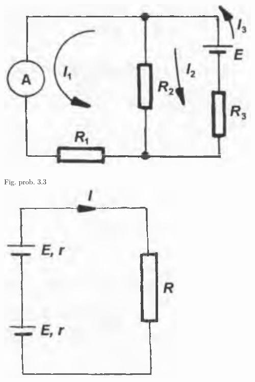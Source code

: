 \documentclass[10pt]{article}
\begin{document}
\begin{center}
\includegraphics[max width=\textwidth]{2025_07_01_5b3ff9fa0d508c8e9f17g-341(1)}
\end{center}

Fig. prob. 3.3\\
\includegraphics[max width=\textwidth, center]{2025_07_01_5b3ff9fa0d508c8e9f17g-341(2)}
\end{document}
